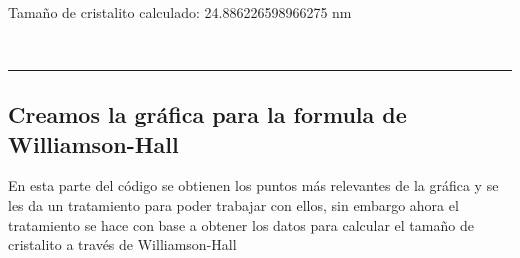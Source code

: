 \documentclass[11pt]{article}
\begin{document}
    ~

Tamaño de cristalito calculado: 24.886226598966275 nm

~

    
    \begin{center}\rule{0.5\linewidth}{0.5pt}\end{center}

    \subsection{Creamos la gráfica para la formula de
Williamson-Hall}\label{creamos-la-gruxe1fica-para-la-formula-de-williamson-hall}

En esta parte del código se obtienen los puntos más relevantes de la
gráfica y se les da un tratamiento para poder trabajar con ellos, sin
embargo ahora el tratamiento se hace con base a obtener los datos para
calcular el tamaño de cristalito a través de Williamson-Hall
\end{document}
